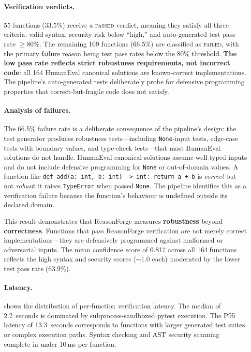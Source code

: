 \documentclass[11pt,a4paper]{article}
\begin{document}
\paragraph{Verification verdicts.}
55 functions (33.5\%) receive a \textsc{passed} verdict, meaning they
satisfy all three criteria: valid syntax, security risk below ``high,''
and auto-generated test pass rate $\geq 80\%$.  The remaining 109
functions (66.5\%) are classified as \textsc{failed}, with the primary
failure reason being test pass rates below the 80\% threshold.
\textbf{The low pass rate reflects strict robustness requirements, not
incorrect code}: all 164 HumanEval canonical solutions are known-correct
implementations.  The pipeline's auto-generated tests deliberately probe
for defensive programming properties that correct-but-fragile code does
not satisfy.

\paragraph{Analysis of failures.}
The 66.5\% failure rate is a deliberate consequence of the pipeline's
design: the test generator produces robustness tests---including
\texttt{None}-input tests, edge-case tests with boundary values, and
type-check tests---that most HumanEval solutions do not handle.  HumanEval
canonical solutions assume well-typed inputs and do not include defensive
programming for \texttt{None} or out-of-domain values.  A function like
\texttt{def add(a:~int, b:~int) -> int: return a + b} is \emph{correct}
but not \emph{robust}: it raises \texttt{TypeError} when passed
\texttt{None}.  The pipeline identifies this as a verification failure
because the function's behaviour is undefined outside its declared domain.

This result demonstrates that ReasonForge measures \textbf{robustness}
beyond \textbf{correctness}.  Functions that pass ReasonForge verification
are not merely correct implementations---they are defensively programmed
against malformed or adversarial inputs.  The mean confidence score of
0.817 across all 164 functions reflects the high syntax and security
scores ($\sim$1.0 each) moderated by the lower test pass rate (63.9\%).

\paragraph{Latency.}
 shows the distribution of per-function verification
latency.  The median of 2.2~seconds is dominated by subprocess-sandboxed
pytest execution.  The P95 latency of 13.3~seconds corresponds to
functions with larger generated test suites or complex execution paths.
Syntax checking and AST security scanning complete in under 10\,ms per
function.
\end{document}
